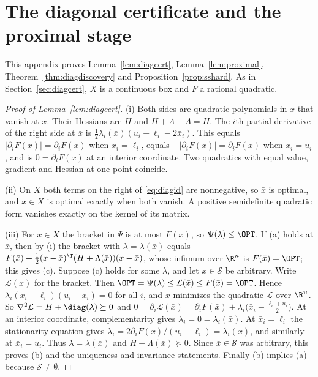 \section{The diagonal certificate and the proximal stage}\label{app:proximal}

This appendix proves Lemma~\ref{lem:diagcert}, Lemma~\ref{lem:proximal},
Theorem~\ref{thm:diagdiscovery} and Proposition~\ref{prop:sshard}. As in
Section~\ref{sec:diagcert}, $X$ is a continuous box and $F$ a rational
quadratic.

\begin{proof}[Proof of Lemma~\ref{lem:diagcert}]
(i) Both sides are quadratic polynomials in $x$ that vanish at $\bar x$.
Their Hessians are $H$ and $H+\Lambda-\Lambda=H$. The $i$th partial
derivative of the right side at $\bar x$ is
$\frac12\lambda_i(\bar x)(u_i+\ell_i-2\bar x_i)$. This equals
$|\partial_iF(\bar x)|=\partial_iF(\bar x)$ when $\bar x_i=\ell_i$, equals
$-|\partial_iF(\bar x)|=\partial_iF(\bar x)$ when $\bar x_i=u_i$, and is
$0=\partial_iF(\bar x)$ at an interior coordinate. Two quadratics with equal
value, gradient and Hessian at one point coincide.

(ii) On $X$ both terms on the right of \eqref{eq:diagid} are nonnegative,
so $\bar x$ is optimal, and $x\in X$ is optimal exactly when both vanish. A
positive semidefinite quadratic form vanishes exactly on the kernel of its
matrix.

(iii) For $x\in X$ the bracket in $\Psi$ is at most $F(x)$, so
$\Psi(\lambda)\le\OPT$. If (a) holds at $\bar x$, then by (i) the bracket
with $\lambda=\lambda(\bar x)$ equals
$F(\bar x)+\frac12(x-\bar x)^{\T}(H+\Lambda(\bar x))(x-\bar x)$, whose
infimum over $\R^n$ is $F(\bar x)=\OPT$; this gives (c). Suppose (c) holds
for some $\lambda$, and let $\bar x\in\mathcal S$ be arbitrary. Write
$\mathcal L(x)$ for the bracket. Then
$\OPT=\Psi(\lambda)\le\mathcal L(\bar x)\le F(\bar x)=\OPT$. Hence
$\lambda_i(\bar x_i-\ell_i)(u_i-\bar x_i)=0$ for all $i$, and $\bar x$
minimizes the quadratic $\mathcal L$ over $\R^n$. So
$\nabla^2\mathcal L=H+\diag(\lambda)\succeq0$ and
$0=\partial_i\mathcal L(\bar x)=\partial_iF(\bar x)+\lambda_i\bigl(\bar x_i-\tfrac{\ell_i+u_i}2\bigr)$.
At an interior coordinate, complementarity gives
$\lambda_i=0=\lambda_i(\bar x)$. At $\bar x_i=\ell_i$ the stationarity
equation gives $\lambda_i=2\partial_iF(\bar x)/(u_i-\ell_i)=\lambda_i(\bar x)$,
and similarly at $\bar x_i=u_i$. Thus $\lambda=\lambda(\bar x)$ and
$H+\Lambda(\bar x)\succeq0$. Since $\bar x\in\mathcal S$ was arbitrary, this
proves (b) and the uniqueness and invariance statements. Finally (b) implies
(a) because $\mathcal S\ne\emptyset$.
\end{proof}

